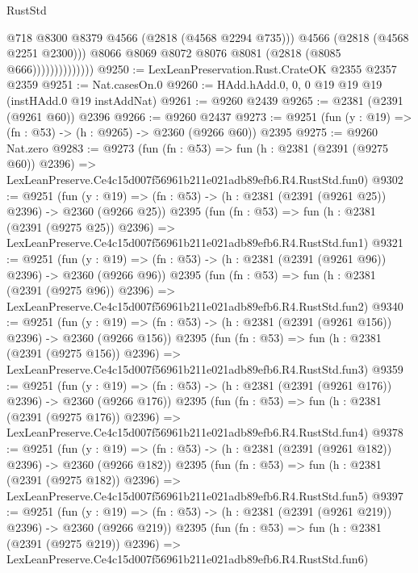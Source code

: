 \begin{lexlean}{RustStd}
\begin{coremodule}
                                @718
                                @8300
                                @8379
                                @4566
                                (@2818 (@4568 @2294 @735)))
                              @4566
                              (@2818 (@4568 @2251 @2300)))
                            @8066
                            @8069
                            @8072
                            @8076
                            @8081
                            (@2818 (@8085 @666))))))))))))))
@9250 := LexLeanPreservation.Rust.CrateOK @2355 @2357 @2359
@9251 := Nat.casesOn.{0}
@9260 := HAdd.hAdd.{0, 0, 0} @19 @19 @19 (instHAdd.{0} @19 instAddNat)
@9261 := @9260 @2439
@9265 := @2381 (@2391 (@9261 @60)) @2396
@9266 := @9260 @2437
@9273 := @9251 (fun (y : @19) => (fn : @53) -> (h : @9265) -> @2360 (@9266 @60)) @2395
@9275 := @9260 Nat.zero
@9283 := @9273
    (fun (fn : @53) =>
    fun (h : @2381 (@2391 (@9275 @60)) @2396) =>
    LexLeanPreserve.Ce4c15d007f56961b211e021adb89efb6.R4.RustStd.fun0)
@9302 := @9251
    (fun (y : @19) => (fn : @53) -> (h : @2381 (@2391 (@9261 @25)) @2396) -> @2360 (@9266 @25))
    @2395
    (fun (fn : @53) =>
    fun (h : @2381 (@2391 (@9275 @25)) @2396) =>
    LexLeanPreserve.Ce4c15d007f56961b211e021adb89efb6.R4.RustStd.fun1)
@9321 := @9251
    (fun (y : @19) => (fn : @53) -> (h : @2381 (@2391 (@9261 @96)) @2396) -> @2360 (@9266 @96))
    @2395
    (fun (fn : @53) =>
    fun (h : @2381 (@2391 (@9275 @96)) @2396) =>
    LexLeanPreserve.Ce4c15d007f56961b211e021adb89efb6.R4.RustStd.fun2)
@9340 := @9251
    (fun (y : @19) => (fn : @53) -> (h : @2381 (@2391 (@9261 @156)) @2396) -> @2360 (@9266 @156))
    @2395
    (fun (fn : @53) =>
    fun (h : @2381 (@2391 (@9275 @156)) @2396) =>
    LexLeanPreserve.Ce4c15d007f56961b211e021adb89efb6.R4.RustStd.fun3)
@9359 := @9251
    (fun (y : @19) => (fn : @53) -> (h : @2381 (@2391 (@9261 @176)) @2396) -> @2360 (@9266 @176))
    @2395
    (fun (fn : @53) =>
    fun (h : @2381 (@2391 (@9275 @176)) @2396) =>
    LexLeanPreserve.Ce4c15d007f56961b211e021adb89efb6.R4.RustStd.fun4)
@9378 := @9251
    (fun (y : @19) => (fn : @53) -> (h : @2381 (@2391 (@9261 @182)) @2396) -> @2360 (@9266 @182))
    @2395
    (fun (fn : @53) =>
    fun (h : @2381 (@2391 (@9275 @182)) @2396) =>
    LexLeanPreserve.Ce4c15d007f56961b211e021adb89efb6.R4.RustStd.fun5)
@9397 := @9251
    (fun (y : @19) => (fn : @53) -> (h : @2381 (@2391 (@9261 @219)) @2396) -> @2360 (@9266 @219))
    @2395
    (fun (fn : @53) =>
    fun (h : @2381 (@2391 (@9275 @219)) @2396) =>
    LexLeanPreserve.Ce4c15d007f56961b211e021adb89efb6.R4.RustStd.fun6)

\end{coremodule}
\end{lexlean}
